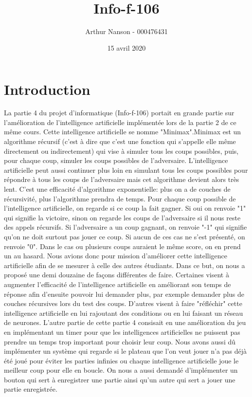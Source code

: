 \documentclass{report}
\title{Info-f-106}
\author{Arthur Nanson - 000476431}
\date {15 avril 2020}
\begin{document}
\maketitle
\tableofcontents

\chapter{Introduction}

La partie 4 du projet d'informatique (Info-f-106) portait en grande partie sur l'amélioration de l'intelligence artificielle implémentée lors de la partie 2 de ce même cours. Cette intelligence artificielle se nomme "Minimax".\newline Minimax est un algorithme récursif (c'est à dire que c'est une fonction qui s'appelle elle même directement ou indirectement) qui vise à simuler tous les coups possibles, puis, pour chaque coup, simuler les coups possibles de l'adversaire. L'intelligence artificielle peut aussi continuer plus loin en simulant tous les coups possibles pour répondre à tous les coups de l'adversaire mais cet algorithme devient alors très lent. C'est une efficacité d'algorithme exponentielle: plus on a de couches de récursivité, plus l'algorithme prendra de temps. \newline Pour chaque coup possible de l'intelligence artificielle, on regarde si ce coup la fait gagner. Si oui on renvoie "1" qui signifie la victoire, sinon on regarde les coups de l'adversaire si il nous reste des appels récursifs. Si l'adversaire a un coup gagnant, on renvoie "-1" qui signifie qu'on ne doit surtout pas jouer ce coup. Si aucun de ces cas ne s'est présenté, on renvoie "0". Dans le cas ou plusieurs coups auraient le même score, on en prend un au hasard.
\newline Nous avions donc pour mission d'améliorer cette intelligence artificielle afin de se mesurer à celle des autres étudiants. Dans ce but, on nous a proposé une demi douzaine de façons différentes de faire. Certaines visent à augmenter l'efficacité de l'intelligence artificielle en améliorant son temps de réponse afin d'ensuite pouvoir lui demander plus, par exemple demander plus de couches récursives lors du test des coups. D'autres visent à faire "réfléchir" cette intelligence artificielle en lui rajoutant des conditions ou en lui faisant un réseau de neurones.
\newline L'autre partie de cette partie 4 consisait en une amélioration du jeu en implémentant un timer pour que les intelligences artificielles ne puissent pas prendre un temps trop important pour choisir leur coup.
\newline Nous avons aussi dû implémenter un système qui regarde si le plateau que l'on veut jouer n'a pas déjà été joué pour éviter les parties infinies ou chaque intelligence artificielle joue le meilleur coup pour elle en boucle.
\newline On nous a aussi demandé d'implémenter un bouton qui sert à enregistrer une partie ainsi qu'un autre qui sert a jouer une partie enregistrée.
\end{document}
